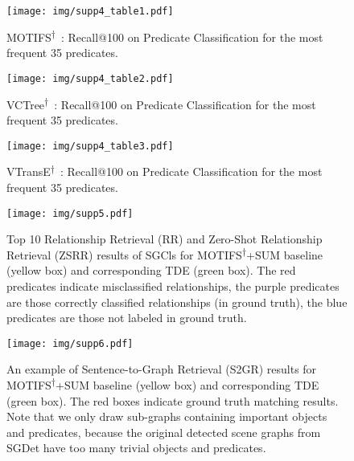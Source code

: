 \documentclass[10pt,twocolumn,letterpaper]{article}
\begin{document}
\begin{figure}
   \begin{minipage}[b]{1\linewidth}
   \centerline{\texttt{[image: img/supp4\_table1.pdf]}}
   \end{minipage}
   \caption{MOTIFS\textsuperscript{$\dagger$}~\cite{zellers2018neural}: Recall@100 on Predicate Classification for the most frequent 35 predicates.}
   \label{supp_fig:q1} \end{figure}

\begin{figure}
   \begin{minipage}[b]{1\linewidth}
   \centerline{\texttt{[image: img/supp4\_table2.pdf]}}
   \end{minipage}
   \caption{VCTree\textsuperscript{$\dagger$}~\cite{tang2019learning}: Recall@100 on Predicate Classification for the most frequent 35 predicates.}
   \label{supp_fig:q2} \end{figure}

\begin{figure}
   \begin{minipage}[b]{1\linewidth}
   \centerline{\texttt{[image: img/supp4\_table3.pdf]}}
   \end{minipage}
   \caption{VTransE\textsuperscript{$\dagger$}~\cite{zhang2017visual}: Recall@100 on Predicate Classification for the most frequent 35 predicates.}
   \label{supp_fig:q3} \end{figure}



\begin{figure*}
   \begin{minipage}[b]{1\linewidth}
   \centerline{\texttt{[image: img/supp5.pdf]}}
   \end{minipage}
   \caption{Top 10 Relationship Retrieval (RR) and Zero-Shot Relationship Retrieval (ZSRR) results of SGCls for MOTIFS\textsuperscript{$\dagger$}+SUM baseline (yellow box) and corresponding TDE (green box). The red predicates indicate misclassified relationships, the purple predicates are those correctly classified relationships (in ground truth), the blue predicates are those not labeled in ground truth.}
   \label{supp_fig:5} \end{figure*}

\begin{figure*}
   \begin{minipage}[b]{1\linewidth}
   \centerline{\texttt{[image: img/supp6.pdf]}}
   \end{minipage}
   \caption{An example of Sentence-to-Graph Retrieval (S2GR) results for MOTIFS\textsuperscript{$\dagger$}+SUM baseline (yellow box) and corresponding TDE (green box). The red boxes indicate ground truth matching results. Note that we only draw sub-graphs containing important objects and predicates, because the original detected scene graphs from SGDet have too many trivial objects and predicates.}
   \label{supp_fig:6} \end{figure*}
\end{document}

